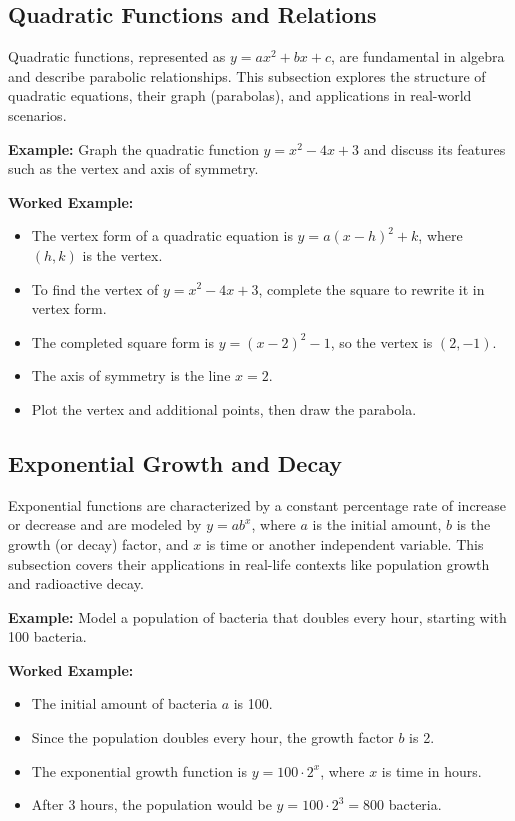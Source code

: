\documentclass{book}
\begin{document}
\subsection{Quadratic Functions and Relations}
Quadratic functions, represented as \( y = ax^2 + bx + c \), are fundamental in algebra and describe parabolic relationships. This subsection explores the structure of quadratic equations, their graph (parabolas), and applications in real-world scenarios.


\textbf{Example:} Graph the quadratic function \( y = x^2 - 4x + 3 \) and discuss its features such as the vertex and axis of symmetry.


\textbf{Worked Example:}
\begin{itemize}
        \item The vertex form of a quadratic equation is \( y = a(x - h)^2 + k \), where \((h, k)\) is the vertex.
        \item To find the vertex of \( y = x^2 - 4x + 3 \), complete the square to rewrite it in vertex form.
        \item The completed square form is \( y = (x - 2)^2 - 1 \), so the vertex is \((2, -1)\).
        \item The axis of symmetry is the line \( x = 2 \).
        \item Plot the vertex and additional points, then draw the parabola.
\end{itemize}


\subsection{Exponential Growth and Decay}
Exponential functions are characterized by a constant percentage rate of increase or decrease and are modeled by \( y = ab^x \), where \( a \) is the initial amount, \( b \) is the growth (or decay) factor, and \( x \) is time or another independent variable. This subsection covers their applications in real-life contexts like population growth and radioactive decay.


\textbf{Example:} Model a population of bacteria that doubles every hour, starting with 100 bacteria.


\textbf{Worked Example:}
\begin{itemize}
        \item The initial amount of bacteria \( a \) is 100.
        \item Since the population doubles every hour, the growth factor \( b \) is 2.
        \item The exponential growth function is \( y = 100 \cdot 2^x \), where \( x \) is time in hours.
        \item After 3 hours, the population would be \( y = 100 \cdot 2^3 = 800 \) bacteria.
\end{itemize}
\end{document}
